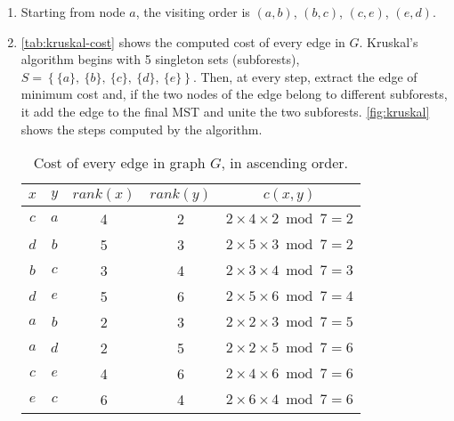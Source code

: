 \begin{enumerate}

  \item Starting from node $a$, the visiting order is $(a,b)$, $(b,c)$, $(c,e)$,
  $(e,d)$.

  \item \autoref{tab:kruskal-cost} shows the computed cost of every edge in $G$.
  Kruskal's algorithm begins with 5 singleton sets (subforests), $S =
  \left\{\{a\},\ \{b\},\ \{c\},\ \{d\},\ \{e\}\right\}$. Then, at every step,
  extract the edge of minimum cost and, if the two nodes of the edge belong to
  different subforests, it add the edge to the final MST and unite the two
  subforests. \autoref{fig:kruskal} shows the steps computed by the algorithm.
  \begin{table}[h]
    \centering
    \begin{tabular}{c|c|c|c|c}
      $x$ & $y$ & $rank(x)$ & $rank(y)$ & $c(x,y)$ \\ \hline\hline
      $c$ & $a$ & 4 & 2 & $2 \times 4 \times 2 \bmod 7 = 2$ \\
      $d$ & $b$ & 5 & 3 & $2 \times 5 \times 3 \bmod 7 = 2$ \\
      $b$ & $c$ & 3 & 4 & $2 \times 3 \times 4 \bmod 7 = 3$ \\
      $d$ & $e$ & 5 & 6 & $2 \times 5 \times 6 \bmod 7 = 4$ \\
      $a$ & $b$ & 2 & 3 & $2 \times 2 \times 3 \bmod 7 = 5$ \\
      $a$ & $d$ & 2 & 5 & $2 \times 2 \times 5 \bmod 7 = 6$ \\
      $c$ & $e$ & 4 & 6 & $2 \times 4 \times 6 \bmod 7 = 6$ \\
      $e$ & $c$ & 6 & 4 & $2 \times 6 \times 4 \bmod 7 = 6$ \\
    \end{tabular}
    \caption{Cost of every edge in graph $G$, in ascending order.}
    \label{tab:kruskal-cost}
  \end{table}
  \begin{figure}[h]
    \begin{subfigure}{0.33\linewidth}
      \centering
\end{subfigure}
\end{figure}
\end{enumerate}
